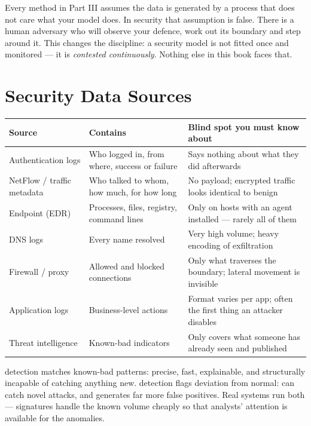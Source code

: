 \begin{alertbox}
Every method in Part III assumes the data is generated by a process that does not
care what your model does. In security that assumption is false. There is a human
adversary who will observe your defence, work out its boundary and step around it.
This changes the discipline: a security model is not fitted once and monitored ---
it is \emph{contested continuously}. Nothing else in this book faces that.
\end{alertbox}

\section{Security Data Sources}

\begin{longtable}{@{}L{2.9cm}L{4.6cm}L{6.7cm}@{}}
\toprule
{}
\textbf{Source} & \textbf{Contains} & \textbf{Blind spot you must know about} \\
\midrule
\endhead
Authentication logs & Who logged in, from where, success or failure & Says nothing about what they did afterwards \\
NetFlow / traffic metadata & Who talked to whom, how much, for how long & No payload; encrypted traffic looks identical to benign \\
Endpoint (EDR) & Processes, files, registry, command lines & Only on hosts with an agent installed --- rarely all of them \\
DNS logs & Every name resolved & Very high volume; heavy encoding of exfiltration \\
Firewall / proxy & Allowed and blocked connections & Only what traverses the boundary; lateral movement is invisible \\
Application logs & Business-level actions & Format varies per app; often the first thing an attacker disables \\
Threat intelligence & Known-bad indicators & Only covers what someone has already seen and published \\
\bottomrule
\end{longtable}

\begin{conceptbox}
 detection matches known-bad patterns: precise, fast, explainable,
and structurally incapable of catching anything new.  detection flags
deviation from normal: can catch novel attacks, and generates far more false
positives. Real systems run both --- signatures handle the known volume cheaply so
that analysts' attention is available for the anomalies.
\end{conceptbox}

